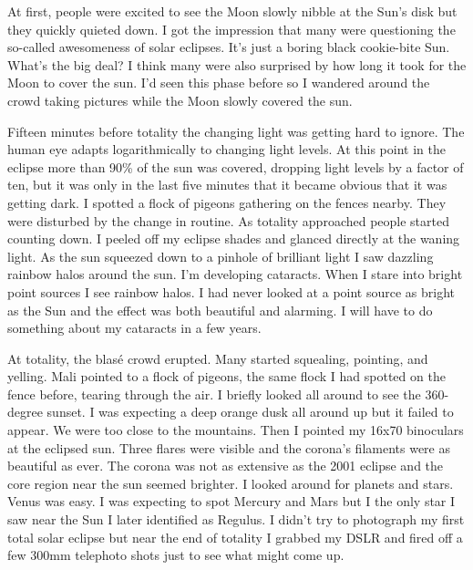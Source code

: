 At first, people were excited to see the Moon slowly nibble at the Sun's
disk but they quickly quieted down. I got the impression that many were
questioning the so-called awesomeness of solar eclipses. It's just a
boring black cookie-bite Sun. What's the big deal? I think many were
also surprised by how long it took for the Moon to cover the sun. I'd
seen this phase before so I wandered around the crowd taking pictures
while the Moon slowly covered the sun.

Fifteen minutes before totality the changing light was getting hard to
ignore. The human eye adapts logarithmically to changing light levels.
At this point in the eclipse more than 90\% of the sun was covered,
dropping light levels by a factor of ten, but it was only in the last
five minutes that it became obvious that it was getting dark. I spotted
a flock of pigeons gathering on the fences nearby. They were disturbed
by the change in routine. As totality approached people started counting
down. I peeled off my eclipse shades and glanced directly at the waning
light. As the sun squeezed down to a pinhole of brilliant light I saw
dazzling rainbow halos around the sun. I'm developing cataracts. When I
stare into bright point sources I see rainbow halos. I had never looked
at a point source as bright as the Sun and the effect was both beautiful
and alarming. I will have to do something about my cataracts in a few
years.


At totality, the blasé crowd erupted. Many started squealing, pointing,
and yelling. Mali pointed to a flock of pigeons, the same flock I had
spotted on the fence before, tearing through the air. I briefly looked
all around to see the 360-degree sunset. I was expecting a deep orange
dusk all around up but it failed to appear. We were too close to the
mountains. Then I pointed my 16x70 binoculars at the eclipsed sun. Three
flares were visible and the corona's filaments were as beautiful as
ever. The corona was not as extensive as the 2001 eclipse and the core
region near the sun seemed brighter. I looked around for planets and
stars. Venus was easy. I was expecting to spot Mercury and Mars but I
the only star I saw near the Sun I later identified as Regulus. I didn't
try to photograph my first total solar eclipse but near the end of
totality I grabbed my DSLR and fired off a few 300mm telephoto shots
just to see what might come up.


